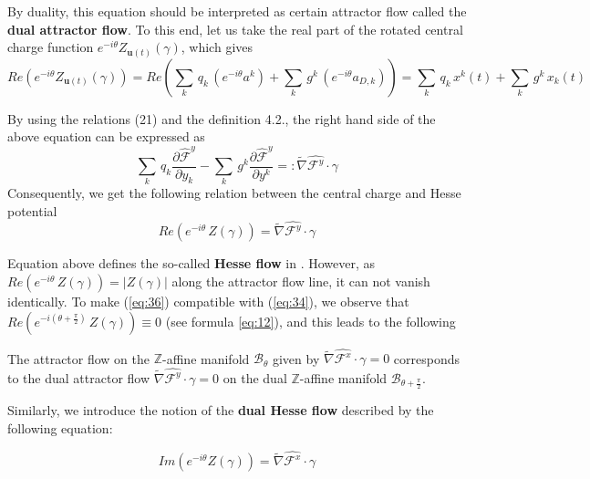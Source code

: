 \documentclass{article}
\begin{document}
By duality, this equation should be interpreted as certain attractor flow called the \textbf{dual attractor flow}. To this end, let us take the real part of the rotated central charge function $e^{-i\theta}Z_{\mathbf{u}(t)}(\gamma)$, which gives
\[Re\left(e^{-i\theta}Z_{\mathbf{u}(t)}(\gamma)\right)=Re\left(\sum_{k}\,q_{k}\,\left(e^{-i\theta}a^{k}\right)+\sum_{k}\,g^{k}\,\left(e^{-i\theta}a_{D,k}\right)\right)= \sum_{k}\,q_{k}\,x^{k}(t)+\sum_{k}\,g^{k}\,x_{k}(t)\]

By using the relations (21) and the definition 4.2., the right hand side of the above equation can be expressed as
\begin{equation}
    \sum_{k}\,q_{k}\frac{\partial\widehat{\mathscr{F}}^{y}}{\partial y_{k}}-\sum_{k}\,g^{k}\frac{\partial\widehat{\mathscr{F}}^{y}}{\partial y^{k}}=:\widetilde{\nabla}\widehat{\mathscr{F}^{y}}\cdot\gamma
\end{equation}
Consequently, we get the following relation between the central charge and Hesse potential
\begin{equation}\label{eq:36}
    Re\left(e^{-i\theta}\,Z(\gamma)\right)=\widetilde{\nabla}\widehat{\mathscr{F}^{y}}\cdot\gamma
\end{equation}

Equation above defines the so-called \textbf{Hesse flow} in \cite{svan2012bps}. However, as $Re\left(e^{-i\theta}\,Z(\gamma)\right)=|Z(\gamma)|$ along the attractor flow line, it can not vanish identically. To make (\ref{eq:36}) compatible with (\ref{eq:34}), we observe that $Re\left(e^{-i(\theta+\frac{\pi}{2})}\,Z(\gamma)\right)\equiv 0$ (see formula \ref{eq:12}), and this leads to the following

\begin{proposition}
The attractor flow on the $\mathbb{Z}$-affine manifold $\mathcal{B}_{\theta}$ given by $\widetilde{\nabla}\widehat{\mathscr{F}^{x}}\cdot\gamma=0$ corresponds to the dual attractor flow $\widetilde{\nabla}\widehat{\mathscr{F}^{y}}\cdot\gamma=0$ on the dual $\mathbb{Z}$-affine manifold $\mathcal{B}_{\theta+\frac{\pi}{2}}$.
\end{proposition}

Similarly, we introduce the notion of the \textbf{dual Hesse flow} described by the following equation:

\begin{equation}\label{eq:37}
    Im\left(e^{-i\theta}Z(\gamma)\right)=\widetilde{\nabla}\widehat{\mathscr{F}^{x}}\cdot\gamma
\end{equation}
\end{document}
